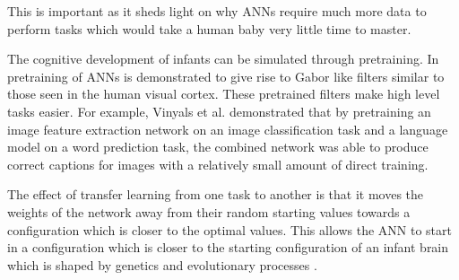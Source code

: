 This is important as it sheds light on why \ac{ANN}s require much more data to perform tasks which would take a human baby very little time to master. 

The cognitive development of infants can be simulated through pretraining. In \cite{lee2008sparse} pretraining of \acp{ANN} is demonstrated to give rise to Gabor like filters similar to those seen in the human visual cortex. These pretrained filters make high level tasks easier. For example, Vinyals et al. \cite{vinyals2015show} demonstrated that by pretraining an image feature extraction network on an image classification task and a language model on a word prediction task, the combined network was able to produce correct captions for images with a  relatively small amount of direct training. 

The effect of transfer learning from one task to another is that it moves the weights of the network away from their random starting values towards a configuration which is closer to the optimal values. This allows the \ac{ANN} to start in a configuration which is closer to the starting configuration of an infant brain which is shaped by genetics and evolutionary processes \cite{barsalou2008grounded}.



